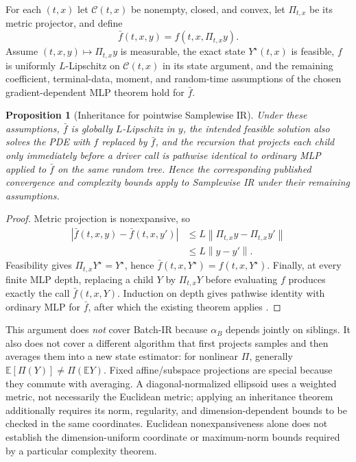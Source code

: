 \documentclass{article}
\newtheorem{proposition}[theorem]{Proposition}
\newcommand{\E}{\mathbb E}
\newcommand{\norm}[1]{\left\lVert #1\right\rVert}
\begin{document}
For each $(t,x)$ let $\mathcal C(t,x)$ be nonempty, closed, and convex, let $\Pi_{t,x}$ be its metric projector, and define
\begin{equation}
\bar f(t,x,y)=f(t,x,\Pi_{t,x}y).
\label{eq:barf}
\end{equation}
Assume $(t,x,y)\mapsto\Pi_{t,x}y$ is measurable, the exact state $Y^\star(t,x)$ is feasible, $f$ is uniformly $L$-Lipschitz on $\mathcal C(t,x)$ in its state argument, and the remaining coefficient, terminal-data, moment, and random-time assumptions of the chosen gradient-dependent MLP theorem hold for $\bar f$.

\begin{proposition}[Inheritance for pointwise Samplewise IR]
Under these assumptions, $\bar f$ is globally $L$-Lipschitz in $y$, the intended feasible solution also solves the PDE with $f$ replaced by $\bar f$, and the recursion that projects each child only immediately before a driver call is pathwise identical to ordinary MLP applied to $\bar f$ on the same random tree. Hence the corresponding published convergence and complexity bounds apply to Samplewise IR under their remaining assumptions.
\end{proposition}
\begin{proof}
Metric projection is nonexpansive, so
\begin{align*}
|\bar f(t,x,y)-\bar f(t,x,y')|
&\le L\norm{\Pi_{t,x}y-\Pi_{t,x}y'}\\
&\le L\norm{y-y'}.
\end{align*}
Feasibility gives $\Pi_{t,x}Y^\star=Y^\star$, hence $\bar f(t,x,Y^\star)=f(t,x,Y^\star)$. Finally, at every finite MLP depth, replacing a child $Y$ by $\Pi_{t,x}Y$ before evaluating $f$ produces exactly the call $\bar f(t,x,Y)$. Induction on depth gives pathwise identity with ordinary MLP for $\bar f$, after which the existing theorem applies \citep{HutzenthalerKruse2020,HutzenthalerJentzenKruse2022,NeufeldWu2025,NeufeldNguyenWu2025}.
\end{proof}

This argument does \emph{not} cover Batch-IR because $\alpha_B$ depends jointly on siblings. It also does not cover a different algorithm that first projects samples and then averages them into a new state estimator: for nonlinear $\Pi$, generally $\E[\Pi(Y)]\neq\Pi(\E Y)$. Fixed affine/subspace projections are special because they commute with averaging. A diagonal-normalized ellipsoid uses a weighted metric, not necessarily the Euclidean metric; applying an inheritance theorem additionally requires its norm, regularity, and dimension-dependent bounds to be checked in the same coordinates. Euclidean nonexpansiveness alone does not establish the dimension-uniform coordinate or maximum-norm bounds required by a particular complexity theorem.
\end{document}
